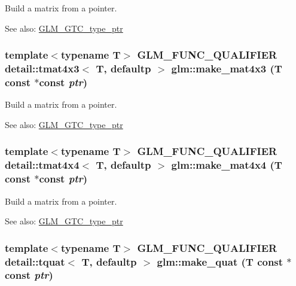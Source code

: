 Build a matrix from a pointer. \begin{Desc}
\item[See also:]\hyperlink{group__gtc__type__ptr}{GLM\_\-GTC\_\-type\_\-ptr} \end{Desc}
\hypertarget{group__gtc__type__ptr_gc375314134d9b3736395a4eda2602590}{
\subsubsection[make\_\-mat4x3]{\setlength{\rightskip}{0pt plus 5cm}template$<$typename T$>$ GLM\_\-FUNC\_\-QUALIFIER detail::tmat4x3$<$ T, defaultp $>$ glm::make\_\-mat4x3 (T const $\ast$const  {\em ptr})}}
\label{group__gtc__type__ptr_gc375314134d9b3736395a4eda2602590}


Build a matrix from a pointer. \begin{Desc}
\item[See also:]\hyperlink{group__gtc__type__ptr}{GLM\_\-GTC\_\-type\_\-ptr} \end{Desc}
\hypertarget{group__gtc__type__ptr_g74e671ae9dc7e5e8f21aa44ea263d76e}{
\subsubsection[make\_\-mat4x4]{\setlength{\rightskip}{0pt plus 5cm}template$<$typename T$>$ GLM\_\-FUNC\_\-QUALIFIER detail::tmat4x4$<$ T, defaultp $>$ glm::make\_\-mat4x4 (T const $\ast$const  {\em ptr})}}
\label{group__gtc__type__ptr_g74e671ae9dc7e5e8f21aa44ea263d76e}


Build a matrix from a pointer. \begin{Desc}
\item[See also:]\hyperlink{group__gtc__type__ptr}{GLM\_\-GTC\_\-type\_\-ptr} \end{Desc}
\hypertarget{group__gtc__type__ptr_gac5b8f1104856835d3d65d854362c85b}{
\subsubsection[make\_\-quat]{\setlength{\rightskip}{0pt plus 5cm}template$<$typename T$>$ GLM\_\-FUNC\_\-QUALIFIER detail::tquat$<$ T, defaultp $>$ glm::make\_\-quat (T const $\ast$const  {\em ptr})}}
\label{group__gtc__type__ptr_gac5b8f1104856835d3d65d854362c85b}



